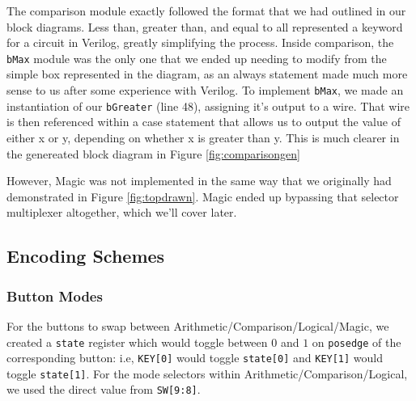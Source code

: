 \documentclass[11pt]{article}
\begin{document}
The comparison module exactly followed the format that we had outlined in our block diagrams. Less than, greater than, and equal to all represented a keyword for a circuit in Verilog, greatly simplifying the process. Inside comparison, the \texttt{bMax} module was the only one that we ended up needing to modify from the simple box represented in the diagram, as an always statement made much more sense to us after some experience with Verilog. To implement \texttt{bMax}, we made an instantiation of our \texttt{bGreater} (line 48), assigning it's output to a wire. That wire is then referenced within a case statement that allows us to output the value of either x or y, depending on whether x is greater than y. This is much clearer in the genereated block diagram in Figure \ref{fig:comparisongen}

However, Magic was not implemented in the same way that we originally had demonstrated in Figure \ref{fig:topdrawn}. Magic ended up bypassing that selector multiplexer altogether, which we'll cover later.

\subsection{Encoding Schemes}
\subsubsection{Button Modes}
For the buttons to swap between Arithmetic/Comparison/Logical/Magic, we created a \texttt{state} register which would toggle between $0$ and $1$ on \texttt{posedge} of the corresponding button: i.e, \texttt{KEY[0]} would toggle \texttt{state[0]} and \texttt{KEY[1]} would toggle \texttt{state[1]}. For the mode selectors within Arithmetic/Comparison/Logical, we used the direct value from \texttt{SW[9:8]}.
\end{document}
